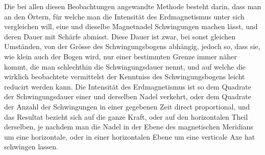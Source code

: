 Die bei allen diesen Beobachtungen angewandte Methode besteht darin, dass
man an den Örtern, für welche man die Intensität des Erdmagnetismus unter sich
vergleichen will, eine und dieselbe Magnetnadel Schwingungen machen lässt,
und deren Dauer mit Schärfe abmisst. Diese Dauer ist zwar, bei sonst gleichen
Umständen, von der Grösse des Schwingungsbogens abhängig, jedoch so, dass sie,
wie klein auch der Bogen wird, nur einer bestimmten Grenze immer näher kommt,
die man schlechthin die Schwingungsdauer nennt, und auf welche die wirklich
beobachtete vermittelst der Kenntniss des Schwingungsbogens leicht reducirt
werden kann. Die Intensität des Erdmagnetismus ist so dem Quadrate der
Schwingungsdauer einer und derselben Nadel verkehrt, oder dem Quadrate der
Anzahl der Schwingungen in einer gegebenen Zeit direct proportional, und das
Resultat bezieht sich auf die ganze Kraft, oder auf den horizontalen Theil
derselben, je nachdem man die Nadel in der Ebene des magnetischen Meridians
um eine horizontale, oder in einer horizontalen Ebene um eine verticale Axe
hat schwingen lassen.

